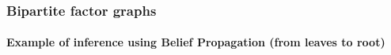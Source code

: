 \documentclass[slidestop,compress,mathserif]{beamer}
\begin{document}
 \begin{frame}
	\frametitle{Bipartite factor graphs}
    \framesubtitle{Example of inference using Belief Propagation (from leaves to root)}
\begin{center}

\end{center}
\end{frame}
\end{document}
